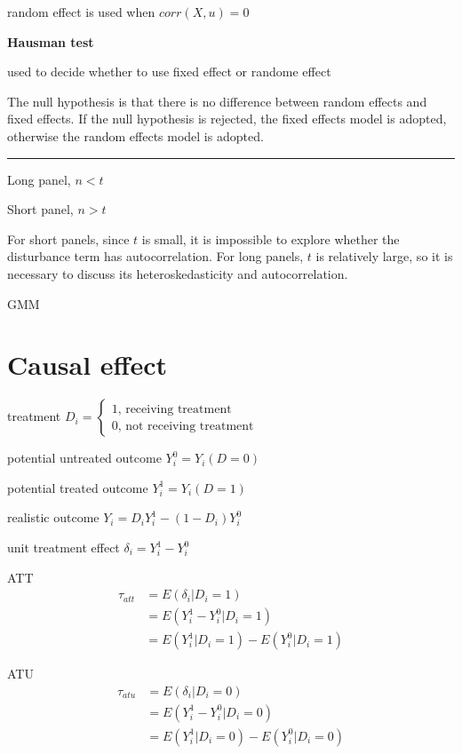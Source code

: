 \documentclass{article}
\newcommand*\sepline{%
  \begin{center}
    \rule[1ex]{.5\textwidth}{.5pt}
  \end{center}}
\begin{document}
random effect is used when $corr(X,u)=0$

\textbf{Hausman test}

used to decide whether to use fixed effect or randome effect

The null hypothesis is that there is no difference between random effects and fixed effects. If the null hypothesis is rejected, the fixed effects model is adopted, otherwise the random effects model is adopted.

\sepline

Long panel, $n<t$

Short panel, $n>t$

For short panels, since $t$ is small, it is impossible to explore whether the disturbance term has autocorrelation. For long panels, $t$ is relatively large, so it is necessary to discuss its heteroskedasticity and autocorrelation.

GMM


\section{Causal effect}

treatment
$D_i=
\begin{cases}
  1 \text{, receiving treatment}\\
  0 \text{, not receiving treatment}
\end{cases}$

potential untreated outcome
$Y_{i}^{0}=Y_{i}(D=0)$

potential treated outcome
$Y_{i}^{1}=Y_{i}(D=1)$

realistic outcome
$Y_{i}=D_{i}Y_{i}^{1}-(1-D_{i})Y_{i}^{0}$

unit treatment effect
$\delta_{i}=Y_{i}^{1}-Y_{i}^{0}$

ATT
\begin{equation}
\begin{split}
\tau_{att}&=E(\delta_{i}|D_{i}=1)
\\&=E(Y^{1}_{i}-Y^{0}_{i}|D_{i}=1)
\\&=E(Y^{1}_{i}|D_{i}=1)-E(Y^{0}_{i}|D_{i}=1)
\end{split}
\end{equation}


ATU
\begin{equation}
\begin{split}
\tau_{atu}&=E(\delta_{i}|D_{i}=0)
\\&=E(Y^{1}_{i}-Y^{0}_{i}|D_{i}=0)
\\&=E(Y^{1}_{i}|D_{i}=0)-E(Y^{0}_{i}|D_{i}=0)
\end{split}
\end{equation}
\end{document}
